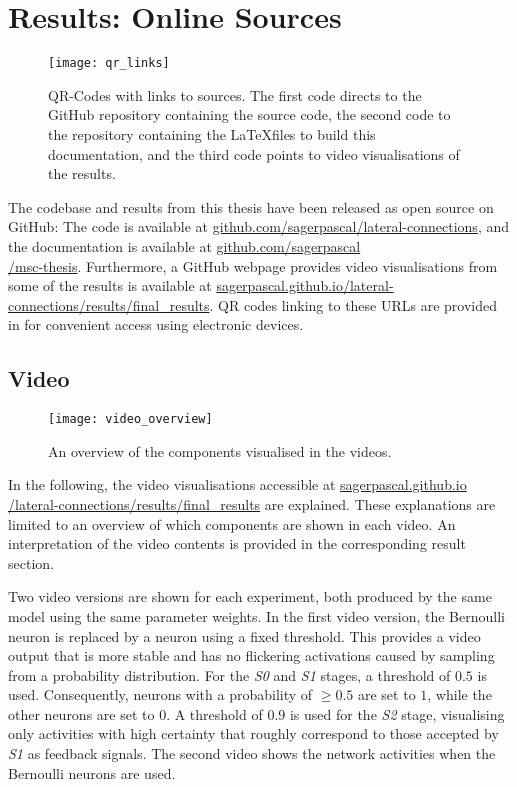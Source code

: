 \chapter{Results: Online Sources}
%
\begin{figure}[h]
    \centering
    \texttt{[image: qr\_links]}
    \caption[QR-Codes with links to sources]{QR-Codes with links to sources. The first code directs to the GitHub repository containing the source code, the second code to the repository containing the \LaTeX files to build this documentation, and the third code points to video visualisations of the results.}
\end{figure}
%
The codebase and results from this thesis have been released as open source on GitHub: The code is available at \href{https://github.com/sagerpascal/lateral-connections}{github.com/sagerpascal/lateral-connections}, and the documentation is available at \href{https://github.com/sagerpascal/msc-thesis}{github.com/sagerpascal\\/msc-thesis}.
Furthermore, a GitHub webpage provides video visualisations from some of the results is available at \href{https://sagerpascal.github.io/lateral-connections/results/final_results.html}{sagerpascal.github.io/lateral-connections/results/final\_results}.
QR codes linking to these URLs are provided in  for convenient access using electronic devices.


\section{Video}
%
\begin{figure}[h]
    \centering
    \texttt{[image: video\_overview]}
    \caption[Overview of components visualised in the videos]{An overview of the components visualised in the videos.}
\end{figure}
%
In the following, the video visualisations accessible at \href{https://sagerpascal.github.io/lateral-connections/results/final_results.html}{sagerpascal.github.io\\/lateral-connections/results/final\_results} are explained.
These explanations are limited to an overview of which components are shown in each video.
An interpretation of the video contents is provided in the corresponding result section.

Two video versions are shown for each experiment, both produced by the same model using the same parameter weights.
In the first video version, the Bernoulli neuron is replaced by a neuron using a fixed threshold.
This provides a video output that is more stable and has no flickering activations caused by sampling from a probability distribution.
For the \emph{S0} and \emph{S1} stages, a threshold of $0.5$ is used. Consequently, neurons with a probability of $\geq 0.5$ are set to $1$, while the other neurons are set to $0$.
A threshold of $0.9$ is used for the \emph{S2} stage, visualising only activities with high certainty that roughly correspond to those accepted by \emph{S1} as feedback signals.
The second video shows the network activities when the Bernoulli neurons are used.

